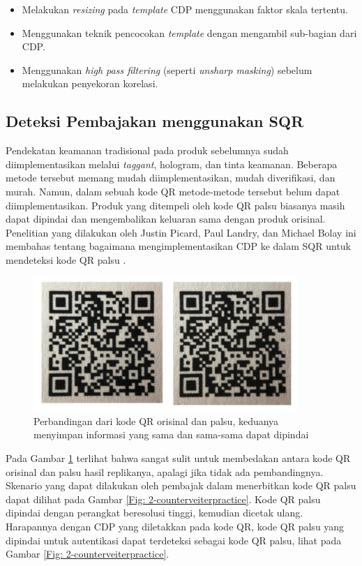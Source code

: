 \begin{itemize}
	\item Melakukan \emph{resizing} pada \emph{template} CDP menggunakan faktor skala tertentu.
	\item Menggunakan teknik pencocokan \emph{template} dengan mengambil sub-bagian dari CDP.
	\item Menggunakan \emph{high pass filtering} (seperti \emph{unsharp masking}) sebelum melakukan penyekoran korelasi.
\end{itemize}

\subsection{Deteksi Pembajakan menggunakan SQR}
Pendekatan keamanan tradisional pada produk sebelumnya sudah diimplementasikan melalui \emph{taggant}, hologram, dan tinta keamanan. Beberapa metode tersebut
memang mudah diimplementasikan, mudah diverifikasi, dan murah. Namun, dalam sebuah kode QR metode-metode tersebut belum dapat diimplementasikan. Produk yang
ditempeli oleh kode QR palsu biasanya masih dapat dipindai dan mengembalikan keluaran sama dengan produk orisinal. Penelitian yang dilakukan oleh Justin
Picard, Paul Landry, dan Michael Bolay ini membahas tentang bagaimana mengimplementasikan CDP ke dalam SQR untuk mendeteksi kode QR palsu
\cite{picard2021counterfeit}.

\begin{figure}[!ht]
	\centering
	\includegraphics[width=10cm]{contents/chapter-2/2-qrorivspalsu.jpg}
	\caption[Perbandingan dari kode QR orisinal dan palsu, keduanya menyimpan informasi yang sama dan sama-sama dapat dipindai]{Perbandingan dari kode QR orisinal dan palsu, keduanya menyimpan informasi yang sama dan sama-sama dapat dipindai \cite{picard2021counterfeit}}
	\label{Fig: 2-qrorivspalsu}
\end{figure}

Pada Gambar \ref{Fig: 2-qrorivspalsu} terlihat bahwa sangat sulit untuk membedakan antara kode QR orisinal dan palsu hasil replikanya, apalagi jika tidak ada
pembandingnya. Skenario yang dapat dilakukan oleh pembajak dalam menerbitkan kode QR palsu dapat dilihat pada Gambar \ref{Fig: 2-counterveiterpractice}. Kode
QR palsu dipindai dengan perangkat beresolusi tinggi, kemudian dicetak ulang. Harapannya dengan CDP yang diletakkan pada kode QR, kode QR palsu yang dipindai
untuk autentikasi dapat terdeteksi sebagai kode QR palsu, lihat pada Gambar \ref{Fig: 2-counterveiterpractice}.

